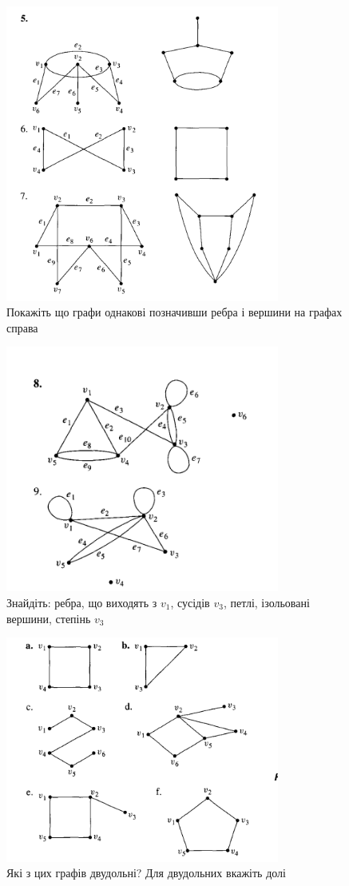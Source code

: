 \documentclass{article}
\begin{document}
\begin{figure}[ht!]
\centering
\includegraphics[width=90mm]{2}
\caption{Покажіть що графи однакові позначивши ребра і вершини на графах справа}
\end{figure}

\begin{figure}[ht!]
\centering
\includegraphics[width=90mm]{4}
\caption{Знайдіть: ребра, що виходять з $v_1$, сусідів $v_3$, петлі, ізольовані вершини, степінь $v_3$}
\end{figure}

\begin{figure}[ht!]
\centering
\includegraphics[width=90mm]{5}
\caption{Які з цих графів двудольні? Для двудольних вкажіть долі}
\end{figure}
\end{document}
